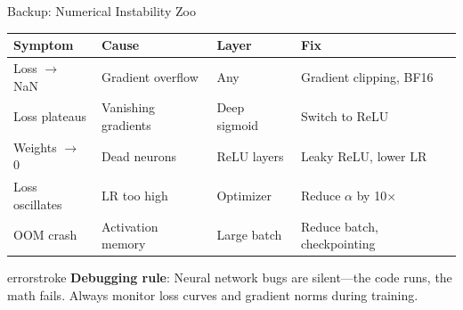 \documentclass[aspectratio=169, 12pt]{beamer}
\begin{document}
\begin{frame}{Backup: Numerical Instability Zoo}
\note{[2 min]

}
\scriptsize
\renewcommand{\arraystretch}{1.05}
\begin{tabular}{@{}lllp{4cm}@{}}
  \toprule
  \textbf{Symptom} & \textbf{Cause} & \textbf{Layer} & \textbf{Fix} \\
  \midrule
  Loss $\to$ NaN & Gradient overflow & Any & Gradient clipping, BF16 \\
  Loss plateaus & Vanishing gradients & Deep sigmoid & Switch to ReLU \\
  Weights $\to$ 0 & Dead neurons & ReLU layers & Leaky ReLU, lower LR \\
  Loss oscillates & LR too high & Optimizer & Reduce $\alpha$ by 10$\times$ \\
  OOM crash & Activation memory & Large batch & Reduce batch, checkpointing \\
  \bottomrule
\end{tabular}

\vspace{0.1cm}
\begin{mlsyscard}{errorstroke}
{\footnotesize \textbf{Debugging rule}: Neural network bugs are silent---the code runs, the math fails. Always monitor loss curves and gradient norms during training.}
\end{mlsyscard}
\end{frame}
\end{document}
